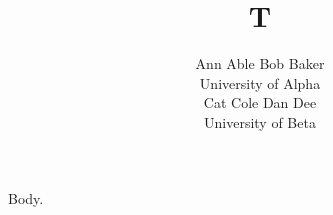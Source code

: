 \documentclass{article}
\begin{document}
\title{T}
\author{Ann Able \quad Bob Baker\\ University of Alpha\\ Cat Cole \quad Dan Dee\\ University of Beta}
\maketitle
Body.
\end{document}
